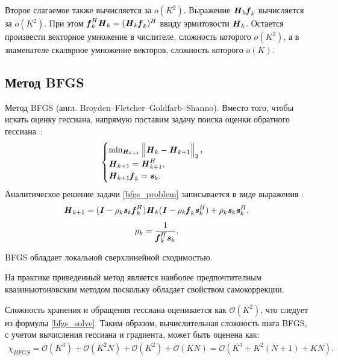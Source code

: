 Второе слагаемое также вычисляется за $o(K^2)$. Выражение $\textbf{\textit{H}}_{k}\textbf{\textit{f}}_{k}$ вычисляется за $o(K^2)$. При этом $\textbf{\textit{f}}_{k}^H\textbf{\textit{H}}_{k}=(\textbf{\textit{H}}_{k}\textbf{\textit{f}}_{k})^H$ ввиду эрмитовости $\textbf{\textit{H}}_{k}$. Остается произвести векторное умножение в числителе, сложность которого $o(K^2)$, а в знаменателе скалярное умножение векторов, сложность которого $o(K)$.

\subsection{Метод BFGS} \label{subsec:quasi_newton_bfgs}
Метод BFGS (англ. Broyden–Fletcher–Goldfarb–Shanno). Вместо того, чтобы искать оценку гессиана, напрямую поставим задачу поиска оценки обратного гессиана~\cite{pract_optimiz}:
\begin{equation}
	\begin{cases}
		\min_{\textbf{\textit{H}}_{k+1}}
		\begin{Vmatrix}
			\textbf{\textit{H}}_{k}-\textbf{\textit{H}}_{k+1}
		\end{Vmatrix}_2,\\
		\textbf{\textit{H}}_{k+1}=\textbf{\textit{H}}_{k+1}^H,\\
		\textbf{\textit{H}}_{k+1}\textbf{\textit{f}}_{k}=\textbf{\textit{s}}_{k}.
	\end{cases}
	\label{bfgs_problem}
\end{equation}
Аналитическое решение задачи \eqref{bfgs_problem} записывается в виде выражения \cite{bfgs_fletcher}:
\begin{equation}
	\textbf{\textit{H}}_{k+1}=(\textbf{\textit{I}}-\rho_{k}\textbf{\textit{s}}_{k}\textbf{\textit{f}}_{k}^H)
	\textbf{\textit{H}}_{k}(\textbf{\textit{I}}-\rho_{k}\textbf{\textit{f}}_{k}\textbf{\textit{s}}_{k}^H)+\rho_{k}\textbf{\textit{s}}_{k}\textbf{\textit{s}}_{k}^H,
	\label{bfgs_solve}
\end{equation}
\begin{equation}
	\rho_{k}=\frac{1}{\textbf{\textit{f}}_{k}^H\textbf{\textit{s}}_{k}}.
	\label{bfgs_solve_rho}
\end{equation}

BFGS обладает локальной сверхлинейной сходимостью. 

На практике приведенный метод является наиболее предпочтителным квазиньютоновским методом поскольку обладает свойством самокоррекции.

Сложность хранения и обращения гессиана оценивается как $\mathcal{O}(K^2)$, что следует из формулы \eqref{bfgs_solve}. Таким образом, вычислительная сложность шага BFGS, с учетом вычисления гессиана и градиента, может быть оценена как:
\begin{align}
	\chi_{BFGS}=\mathcal{O}(K^3)+\mathcal{O}(K^2N)+\mathcal{O}(K^2)+\mathcal{O}(KN)=\mathcal{O}(K^3+K^2(N+1)+KN).
	\label{complexity_bfgs}
\end{align}

